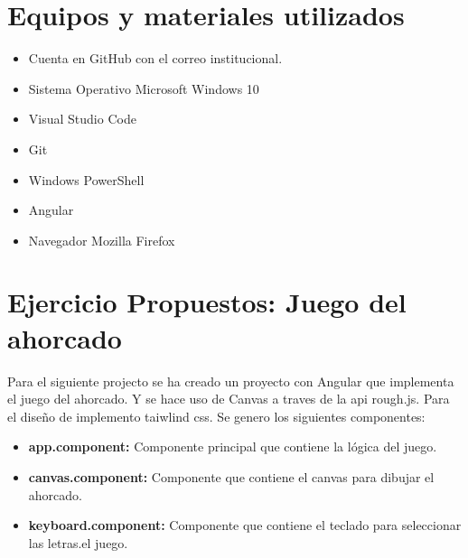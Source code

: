 \documentclass{article}
\begin{document}
\section{Equipos y materiales utilizados}
\begin{itemize}
	\item Cuenta en GitHub con el correo institucional.
	\item Sistema Operativo Microsoft Windows 10
	\item Visual Studio Code
	\item Git
	\item Windows PowerShell
	\item Angular
	\item Navegador Mozilla Firefox
\end{itemize}
\pagebreak

\section{Ejercicio Propuestos: Juego del ahorcado}
Para el siguiente projecto se ha creado un proyecto con Angular que implementa el juego del ahorcado. Y se hace uso de Canvas a traves de la api rough.js. Para el diseño de implemento taiwlind css. Se genero los siguientes componentes:
\begin{itemize}
	\item \textbf{app.component:} Componente principal que contiene la lógica del juego.
	\item \textbf{canvas.component:} Componente que contiene el canvas para dibujar el ahorcado.
	\item \textbf{keyboard.component:} Componente que contiene el teclado para seleccionar las letras.el juego.
\end{itemize}
\end{document}
